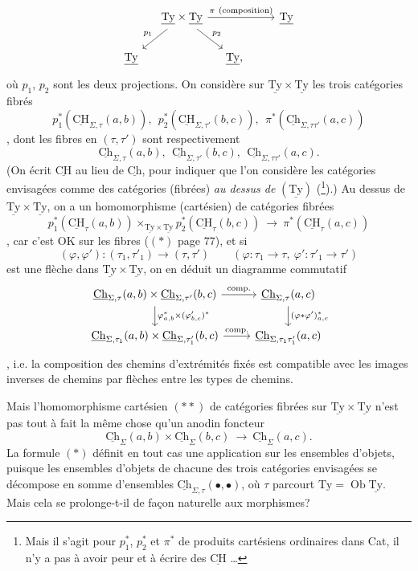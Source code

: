 \documentclass[11pt]{article}
\newcommand{\printedpage}[1]{\marginpar{\footnotesize p.~#1}}
\newcommand{\msp}[1]{\marginpar{\footnotesize [#1]}}
\newcommand{\Ch}{\underline{\mathrm{Ch}}}
\newcommand{\Ty}{\underline{\mathrm{Ty}}}
\newcommand{\CH}{\underline{\mathrm{CH}}}
\begin{document}
\[
\begin{tikzcd}[column sep=small]
 & \Ty\times\Ty \ar[rrr,"\pi\ (\text{composition})"] \ar[dl,"p_1"'] \ar[dr,"p_2"] & & & \Ty \\
\Ty & & \Ty, & &
\end{tikzcd}
\]
où $p_1$, $p_2$ sont les deux projections. On considère sur $\Ty\times\Ty$ les trois catégories fibrés %
\[
p_1^*(\CH_{\Sigma,\tau}(a,b)),\ \ p_2^*(\CH_{\Sigma,\tau'}(b,c)),\ \ \pi^*(\Ch_{\Sigma,\tau\tau'}(a,c))
\]
, dont les fibres en $(\tau,\tau')$ sont respectivement %
\[
\Ch_{\Sigma,\tau}(a,b),\ \ \Ch_{\Sigma,\tau'}(b,c),\ \ \Ch_{\Sigma,\tau\tau'}(a,c).
\]
(On écrit $\CH$ au lieu de $\Ch$, pour indiquer que l'on considère les catégories envisagées comme des catégories (fibrées) \textit{au dessus de} $(\Ty)$ (\footnote{Mais il s'agit pour $p_1^*$, $p_2^*$ et $\pi^*$ de produits cartésiens ordinaires dans Cat, il n'y a pas à avoir peur et à écrire des $\CH$ \ldots}).) Au dessus de $\Ty\times\Ty$, on a un homomorphisme (cartésien) de catégories fibrées
\[
p_1^*(\CH_{\tau}(a,b))\times_{\Ty\times\Ty} p_2^*(\CH_{\tau}(b,c)) \ \longrightarrow\ \pi^*(\CH_{\tau}(a,c)) \tag*{$(**)$}
\]
,
\msp{page 79}
car c'est OK sur les fibres ($(*)$ page 77), et si
\[
(\varphi,\varphi') : (\tau_1,\tau'_1) \longrightarrow (\tau,\tau') \qquad (\varphi : \tau_1 \longrightarrow \tau,\ \varphi' : \tau'_1 \longrightarrow \tau')
\]
est une flèche dans $\Ty\times\Ty$, on en déduit un diagramme commutatif
\[
\begin{tikzcd}
\Ch_{\Sigma,\tau}(a,b)\times\Ch_{\Sigma,\tau'}(b,c) \ar[r,"\text{comp.}"] \ar[d,"\varphi^*_{a,b}\times(\varphi'_{b,c})^*"] & \Ch_{\Sigma,\tau}(a,c) \ar[d,"(\varphi*\varphi')^*_{a,c}"] \\
\Ch_{\Sigma,\tau_1}(a,b)\times\Ch_{\Sigma,\tau'_1}(b,c) \ar[r,"\text{comp.}"] & \Ch_{\Sigma,\tau_1\tau'_1}(a,c)
\end{tikzcd}
\]
\printedpage{52}
, i.e. la composition des chemins d'extrémités fixés est compatible avec les images inverses de chemins par flèches entre les types de chemins.

Mais l'homomorphisme cartésien $(**)$ de catégories fibrées sur $\Ty\times\Ty$ n'est pas tout à fait la même chose qu'un anodin foncteur
\[
\Ch_{\Sigma}(a,b)\times\Ch_{\Sigma}(b,c) \ \longrightarrow\ \Ch_{\Sigma}(a,c). \tag*{$(*)$}
\]
La formule $(*)$ définit en tout cas une application sur les ensembles d'objets, puisque les ensembles d'objets de chacune des trois catégories envisagées se décompose en somme d'ensembles $\Ch_{\Sigma,\tau}(\bullet,\bullet)$, où $\tau$ parcourt $\mathrm{Ty} = \operatorname{Ob}\Ty$. Mais cela se prolonge-t-il de façon naturelle aux morphismes?
\end{document}
